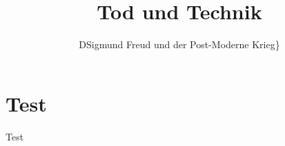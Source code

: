 \documentclass[11pt,a4paper,oneside,numbers=noenddot,bibliography=totocnumbered,DIV=13]{scrartcl}
\begin{document}
\titlehead{Freie Universität Berlin \hfill Autor: Jan Opper\\
Otto-Suhr Institut für Politikwissenschaft\hfill Mat.-Nr.: 4655381\\
SE: Geburt der Moderne oder Zeugung der Post-Moderne\hfill {E-Mail: Opperj@zedat.fu-berlin.de}\\
Leitung: Gerd Harders\hfill 15.10.2014\\
Sommersemester 2014\\} 
\title{\large Tod und Technik} 
\subtitle{\small DSigmund Freud und der Post-Moderne Krieg\}}
\maketitle
\newpage
\tableofcontents
\newpage
\section{Test}
Test




\newpage

\end{document}
